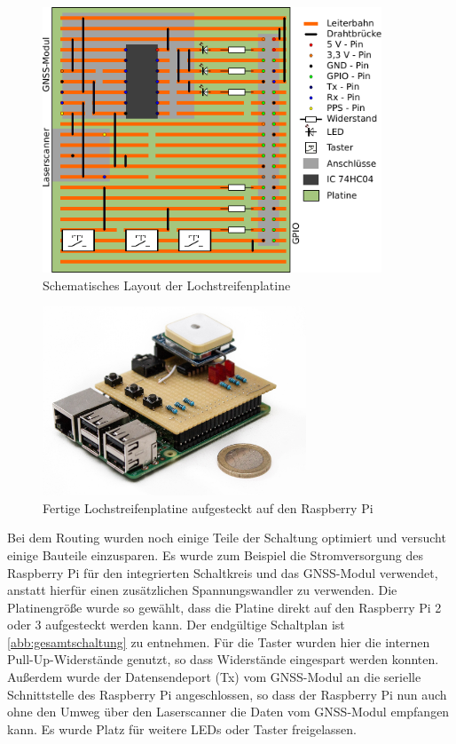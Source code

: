 \documentclass[a4paper,12pt,bibliography=totoc, listof=totoc,titlepage,pointlessnumbers]{scrreprt}
\begin{document}
\begin{figure}
 \centering
 \includegraphics[width=0.9\textwidth]{img/platine.pdf}
 \caption{Schematisches Layout der Lochstreifenplatine}
 \label{abb:platine}
\end{figure}

\begin{figure}
 \centering
 \includegraphics[width=0.7\textwidth]{img/elektronik.jpg}
 \caption{Fertige Lochstreifenplatine aufgesteckt auf den Raspberry Pi}
 \label{abb:elektronik}
\end{figure}

Bei dem Routing wurden noch einige Teile der Schaltung optimiert und versucht einige Bauteile einzusparen. Es wurde zum Beispiel die Strom\-ver\-sor\-gung des Rasp\-berry Pi für den integrierten Schaltkreis und das GNSS-Modul verwendet, anstatt hierfür einen zu\-sätz\-lichen Spannungswandler zu verwenden. Die Platinengröße wurde so gewählt, dass die Platine direkt auf den Rasp\-berry Pi 2 oder 3 aufgesteckt werden kann. Der endgültige Schaltplan ist \autoref{abb:gesamtschaltung} zu entnehmen. Für die Taster wurden hier die internen Pull-Up-Widerstände genutzt, so dass Widerstände eingespart werden konnten. Außerdem wurde der Datensendeport (Tx) vom GNSS-Modul an die serielle Schnittstelle des Rasp\-berry Pi angeschlossen, so dass der Rasp\-berry Pi nun auch ohne den Umweg über den Laser\-scan\-ner die Daten vom GNSS-Modul empfangen kann. Es wurde Platz für weitere LEDs oder Taster freigelassen.
\end{document}
